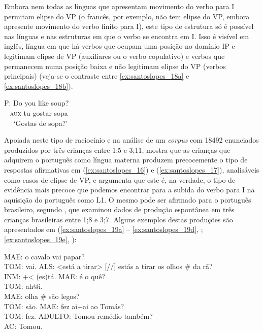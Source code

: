 \documentclass[output=paper]{LSP/langsci}
\begin{document}
Embora nem todas as línguas que apresentam movimento do verbo para I permitam elipse do VP (o francês, por exemplo, não tem elipse do VP, embora apresente movimento do verbo finito para I), este tipo de estrutura só é possível nas línguas e nas estruturas em que o verbo se encontra em I. Isso é visível em inglês, língua em que há verbos que ocupam uma posição no domínio IP e legitimam elipse de VP (auxiliares ou o verbo copulativo) e verbos que permanecem numa posição baixa e não legitimam elipse do VP (verbos principais) (veja-se o contraste entre \ref{ex:santoslopes_18a} e \ref{ex:santoslopes_18b}).

\ea\label{ex:santoslopes_18}
\gll P: Do you like soup?\\
~ \textsc{aux} tu gostar sopa\\
\glt ~~ `Gostas de sopa?'\\
\zl

Apoiada neste tipo de raciocínio e na análise de um \textit{corpus} com 18492 enunciados produzidos por três crianças entre 1;5 e 3;11, \citet{santos2006} mostra que as crianças que adquirem o português como língua materna produzem precocemente o tipo de respostas afirmativas em (\ref{ex:santoslopes_16}) e (\ref{ex:santoslopes_17}), analisáveis como casos de elipse de VP, e argumenta que este é, na verdade, o tipo de evidência mais precoce que podemos encontrar para a subida do verbo para I na aquisição do português como L1. O mesmo pode ser afirmado para o português brasileiro, segundo \citet{lopes2009}, que examinou dados de produção espontânea em três crianças brasileiras entre 1;8 e 3;7. Alguns exemplos destas produções são apresentados em (\ref{ex:santoslopes_19a} -- \ref{ex:santoslopes_19d}, \citealt{santos2006}; \ref{ex:santoslopes_19e}, \citealt{lopes2009}):

\ea\label{ex:santoslopes_19}
\ea\label{ex:santoslopes_19a}
MAE: o cavalo vai papar?\\
TOM: vai.
\ex\label{ex:santoslopes_19b}
ALS: <está a tirar> [//] estás a tirar os olhos \# da rã?\\
INM: +< (es)tá.
\ex\label{ex:santoslopes_19c}
MAE: é o quê?\\
TOM: ah@i.\\
MAE: olha \# são legos?\\
TOM: são.
\ex\label{ex:santoslopes_19d}
MAE: fez ai+ai ao Tomás?\\
TOM: fez.
\ex\label{ex:santoslopes_19e}
ADULTO: Tomou remédio também?\\
AC: Tomou.
\zl
\end{document}

